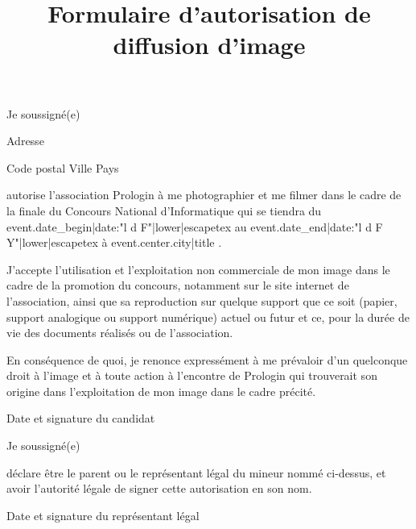 \documentclass[a4paper,11pt]{prologin}
\title{Formulaire d'autorisation de diffusion d'image}
\begin{document}
Je soussigné(e) \hrulefill

Adresse \hrulefill

Code postal \hrulefill{} Ville \hrulefill\hrulefill\hrulefill{} Pays \hrulefill

autorise l'association Prologin à me photographier et me filmer dans
le cadre de la finale du Concours National d'Informatique qui se tiendra du
{{ event.date_begin|date:"l d F"|lower|escapetex }} au
{{ event.date_end|date:"l d F Y"|lower|escapetex }} à {{ event.center.city|title }}.

J'accepte l'utilisation et l'exploitation non commerciale de mon
image dans le cadre de la promotion du concours, notamment sur le site internet
de l'association, ainsi que sa reproduction sur quelque support que ce soit
(papier, support analogique ou support numérique) actuel ou futur et ce, pour la
durée de vie des documents réalisés ou de l'association.

En conséquence de quoi, je renonce expressément à me prévaloir d'un
quelconque droit à l'image et à toute action à l'encontre de Prologin qui
trouverait son origine dans l'exploitation de mon image dans le cadre précité.

\begin{signatureframe}{Date et signature du candidat}\end{signatureframe}

\begin{legalrepframe}[title=À remplir par le représentant légal si le candidat est mineur]
Je soussigné(e) \hrulefill

déclare être le parent ou le représentant légal du mineur nommé
ci-dessus, et avoir l'autorité légale de signer cette autorisation en son nom.

\begin{signatureframe}{Date et signature du représentant légal}\end{signatureframe}
\end{legalrepframe}
\end{document}
